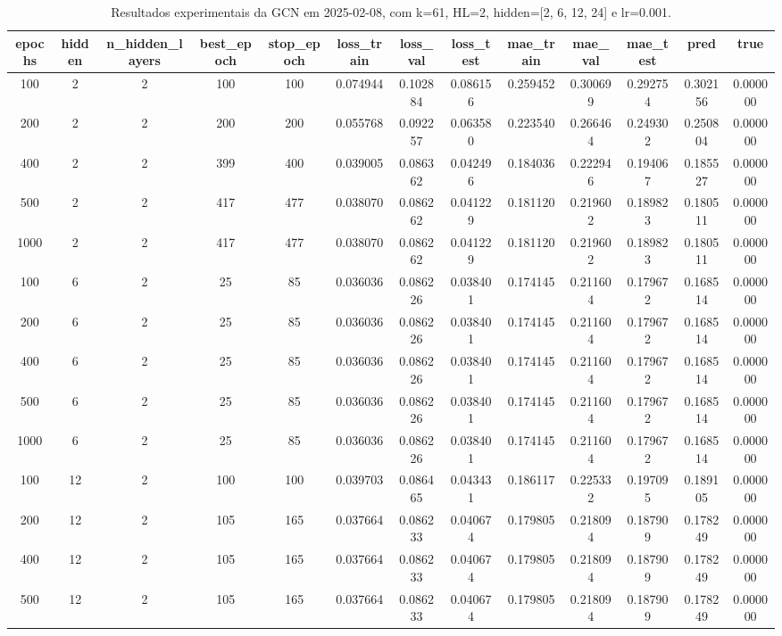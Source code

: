 \begin{table}[h]
\centering
\caption{Resultados experimentais da GCN em 2025-02-08, com k=61, HL=2, hidden=[2, 6, 12, 24] e lr=0.001.}
\label{tab:gcn_results_k61_hl2_d20250208}
\begin{tabular}{ccccccccccccc}
\toprule
epochs & hidden & n\_hidden\_layers & best\_epoch & stop\_epoch & loss\_train & loss\_val & loss\_test & mae\_train & mae\_val & mae\_test & pred & true \\
\midrule
100 & 2 & 2 & 100 & 100 & 0.074944 & 0.102884 & 0.086156 & 0.259452 & 0.300699 & 0.292754 & 0.302156 & 0.000000 \\
200 & 2 & 2 & 200 & 200 & 0.055768 & 0.092257 & 0.063580 & 0.223540 & 0.266464 & 0.249302 & 0.250804 & 0.000000 \\
400 & 2 & 2 & 399 & 400 & 0.039005 & 0.086362 & 0.042496 & 0.184036 & 0.222946 & 0.194067 & 0.185527 & 0.000000 \\
500 & 2 & 2 & 417 & 477 & 0.038070 & 0.086262 & 0.041229 & 0.181120 & 0.219602 & 0.189823 & 0.180511 & 0.000000 \\
1000 & 2 & 2 & 417 & 477 & 0.038070 & 0.086262 & 0.041229 & 0.181120 & 0.219602 & 0.189823 & 0.180511 & 0.000000 \\
100 & 6 & 2 & 25 & 85 & 0.036036 & 0.086226 & 0.038401 & 0.174145 & 0.211604 & 0.179672 & 0.168514 & 0.000000 \\
200 & 6 & 2 & 25 & 85 & 0.036036 & 0.086226 & 0.038401 & 0.174145 & 0.211604 & 0.179672 & 0.168514 & 0.000000 \\
400 & 6 & 2 & 25 & 85 & 0.036036 & 0.086226 & 0.038401 & 0.174145 & 0.211604 & 0.179672 & 0.168514 & 0.000000 \\
500 & 6 & 2 & 25 & 85 & 0.036036 & 0.086226 & 0.038401 & 0.174145 & 0.211604 & 0.179672 & 0.168514 & 0.000000 \\
1000 & 6 & 2 & 25 & 85 & 0.036036 & 0.086226 & 0.038401 & 0.174145 & 0.211604 & 0.179672 & 0.168514 & 0.000000 \\
100 & 12 & 2 & 100 & 100 & 0.039703 & 0.086465 & 0.043431 & 0.186117 & 0.225332 & 0.197095 & 0.189105 & 0.000000 \\
200 & 12 & 2 & 105 & 165 & 0.037664 & 0.086233 & 0.040674 & 0.179805 & 0.218094 & 0.187909 & 0.178249 & 0.000000 \\
400 & 12 & 2 & 105 & 165 & 0.037664 & 0.086233 & 0.040674 & 0.179805 & 0.218094 & 0.187909 & 0.178249 & 0.000000 \\
500 & 12 & 2 & 105 & 165 & 0.037664 & 0.086233 & 0.040674 & 0.179805 & 0.218094 & 0.187909 & 0.178249 & 0.000000 \\

\end{tabular}
\end{table}
